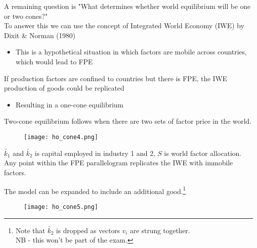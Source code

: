 \documentclass{beamer}
\begin{document}
\begin{frame}
 A remaining question is "What determines whether world equilibrium will be one or two cones?"\\
 To answer this we can use the concept of Integrated World Economy (IWE) by Dixit \& Norman (1980)
 \begin{itemize}
   \item This is a hypothetical situation in which factors are mobile across countries, which would lead to FPE   
 \end{itemize}
 \medskip
 If production factors are confined to countries but there is FPE, the IWE production of goods could be replicated 
 \begin{itemize}
   \item Resulting in a one-cone equilibrium   
 \end{itemize}
 \medskip
 Two-cone equilibrium follows when there are two sets of factor price in the world.
\end{frame}

\begin{frame}
  \begin{figure}
    \texttt{[image: ho\_cone4.png]}
  \end{figure}
  $\widetilde{k_1}$ and $\widetilde{k_2}$ is capital employed in industry 1 and 2, $S$ is world factor allocation.\\
  Any point within the FPE parallelogram replicates the IWE with immobile factors.  
\end{frame}

\begin{frame}
The model can be expanded to include an additional good.\footnote{Note that $\widetilde{k_2}$ is dropped as vectors $v_i$ are strung together. \\ NB - this won't be part of the exam. }
  \begin{figure}
    \texttt{[image: ho\_cone5.png]}
  \end{figure}
\end{frame}
\end{document}

